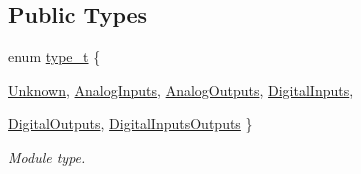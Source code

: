 \subsection*{Public Types}
\begin{DoxyCompactItemize}
\item 
enum \hyperlink{classmdt_device_modbus_wago_module_a2d8f6895b2a031c953bd91c2f65a1a25}{type\_\-t} \{ \par
\hyperlink{classmdt_device_modbus_wago_module_a2d8f6895b2a031c953bd91c2f65a1a25aa195556cb75e827f16f81e9f09908660}{Unknown}, 
\hyperlink{classmdt_device_modbus_wago_module_a2d8f6895b2a031c953bd91c2f65a1a25a70609836e6ef603f912da6084adf3c9d}{AnalogInputs}, 
\hyperlink{classmdt_device_modbus_wago_module_a2d8f6895b2a031c953bd91c2f65a1a25a38c67b211155faa87f52767c60134f33}{AnalogOutputs}, 
\hyperlink{classmdt_device_modbus_wago_module_a2d8f6895b2a031c953bd91c2f65a1a25aee246eb286603d48008177621980eda4}{DigitalInputs}, 
\par
\hyperlink{classmdt_device_modbus_wago_module_a2d8f6895b2a031c953bd91c2f65a1a25ace992008f0003a8ee2106872b6a410a3}{DigitalOutputs}, 
\hyperlink{classmdt_device_modbus_wago_module_a2d8f6895b2a031c953bd91c2f65a1a25adbe63d8313a77922b9a7808a5321fdb7}{DigitalInputsOutputs}
 \}
\begin{DoxyCompactList}\small\item\em Module type. \end{DoxyCompactList}\end{DoxyCompactItemize}
